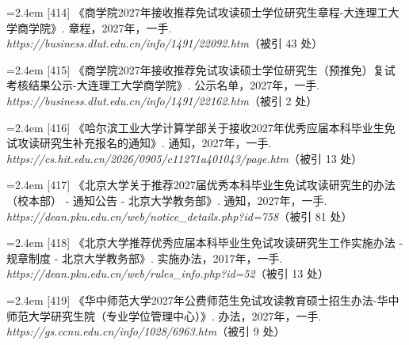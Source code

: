 {\vspace{0.6pt}
\noindent\hangindent=2.4em \label{src:S0550}{\color{cAccent}[414]} 《商学院2027年接收推荐免试攻读硕士学位研究生章程-大连理工大学商学院》. 章程，2027年，一手. \textit{https://business.dlut.edu.cn/info/1491/22092.htm}（被引 43 处）\par
\vspace{0.6pt}
\noindent\hangindent=2.4em \label{src:S0551}{\color{cAccent}[415]} 《商学院2027年接收推荐免试攻读硕士学位研究生（预推免）复试考核结果公示-大连理工大学商学院》. 公示名单，2027年，一手. \textit{https://business.dlut.edu.cn/info/1491/22162.htm}（被引 2 处）\par
\vspace{0.6pt}
\vspace{3.5pt}\par
\nopagebreak\vspace{1pt}
\noindent\hangindent=2.4em \label{src:S0552}{\color{cAccent}[416]} 《哈尔滨工业大学计算学部关于接收2027年优秀应届本科毕业生免试攻读研究生补充报名的通知》. 通知，2027年，一手. \textit{https://cs.hit.edu.cn/2026/0905/c11271a401043/page.htm}（被引 13 处）\par
\vspace{0.6pt}
\vspace{3.5pt}\par
\nopagebreak\vspace{1pt}
\noindent\hangindent=2.4em \label{src:S0553}{\color{cAccent}[417]} 《北京大学关于推荐2027届优秀本科毕业生免试攻读研究生的办法 （校本部） - 通知公告 - 北京大学教务部》. 通知，2027年，一手. \textit{https://dean.pku.edu.cn/web/notice\_details.php?id=758}（被引 81 处）\par
\vspace{0.6pt}
\noindent\hangindent=2.4em \label{src:S0554}{\color{cAccent}[418]} 《北京大学推荐优秀应届本科毕业生免试攻读研究生工作实施办法 - 规章制度 - 北京大学教务部》. 实施办法，2017年，一手. \textit{https://dean.pku.edu.cn/web/rules\_info.php?id=52}（被引 13 处）\par
\vspace{0.6pt}
\vspace{3.5pt}\par
\nopagebreak\vspace{1pt}
\noindent\hangindent=2.4em \label{src:S0559}{\color{cAccent}[419]} 《华中师范大学2027年公费师范生免试攻读教育硕士招生办法-华中师范大学研究生院（专业学位管理中心）》. 办法，2027年，一手. \textit{https://gs.ccnu.edu.cn/info/1028/6963.htm}（被引 9 处）\par
}
